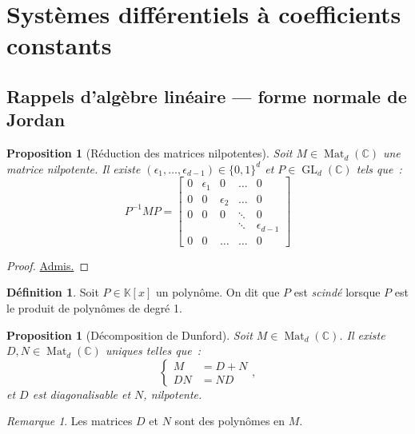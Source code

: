 \documentclass{report}
\newtheorem{prp}[thm]{Proposition}
\theoremstyle{definition}
\newtheorem{déf}[thm]{Définition}
\theoremstyle{remark}
\newtheorem*{rmq}{Remarque}
\numberwithin{equation}{section}
\newcommand{\K}{\mathbb K}
\newcommand{\C}{\mathbb C}
\DeclareMathOperator{\Mat}{Mat}
\DeclareMathOperator{\GL}{GL}
\newcommand{\grantedproof}{\begin{proof} \underline{Admis.} \end{proof}}
\begin{document}
	\section{Systèmes différentiels à coefficients constants}
		\subsection{Rappels d'algèbre linéaire --- forme normale de Jordan}
			\begin{prp}[Réduction des matrices nilpotentes]Soit $M \in \Mat_d(\C)$ une matrice nilpotente. Il existe $(\epsilon_1, \ldots, \epsilon_{d-1}) \in
			\{0, 1\}^d$ et $P \in \GL_d(\C)$ tels que~:
			\begin{equation}
				P^{-1}MP =
			\begin{bmatrix}
				0 & \epsilon_1 & 0 & \ldots & 0 \\
				0 & 0 & \epsilon_2 & \ldots & 0 \\
				0 & 0 & 0		  & \ddots & 0 \\
				  & &   &  \ddots   & \epsilon_{d-1} \\
				0 & 0 & \ldots & \ldots & 0
			\end{bmatrix}
			\end{equation}
			\end{prp}

			\grantedproof

			\begin{déf} Soit $P \in \K[x]$ un polynôme. On dit que $P$ est \textit{scindé} lorsque $P$ est le produit de polynômes de degré 1.
			\end{déf}

			\begin{prp}[Décomposition de Dunford] Soit $M \in \Mat_d(\C)$. Il existe $D, N \in \Mat_d(\C)$ uniques telles que~:
			\begin{equation}
				\begin{cases}M &=D+N \\DN &= ND\end{cases},
			\end{equation}
			et $D$ est diagonalisable et $N$, nilpotente.
			\end{prp}

			\begin{rmq} Les matrices $D$ et $N$ sont des polynômes en $M$.
			\end{rmq}
\end{document}
